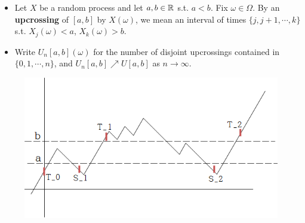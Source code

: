 \documentclass[10pt,a4paper]{report}
\begin{document}
\begin{itemize}
\item Let $X$ be a random process and let $a,b\in \mathbb{R}$ s.t. $a<b$. Fix $\omega \in \Omega$. By an \textbf{upcrossing} of $[a,b]$ by $X(\omega)$, we mean an interval of times $\{j,j+1, \cdots, k\}$ s.t. $X_j(\omega) <a$, $X_k(\omega) >b$.

\item Write $U_n[a,b](\omega)$ for the number of disjoint upcrossings contained in $\{0,1,\cdots,n\}$, and $U_n[a,b] \nearrow U[a,b]$ as $n\rightarrow \infty$.
\end{itemize}
\s

\begin{center}
	\begin{figure}
		\includegraphics[scale=0.5]{upcrossing}
	\end{figure}
\end{center}
\end{document}
